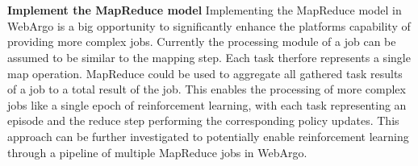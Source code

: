 \\~\\
\textbf{Implement the MapReduce model}
Implementing the MapReduce \cite{conclusion:map-reduce} model in WebArgo is a big opportunity to significantly enhance the platforms capability of providing more complex jobs. Currently the processing module of a job can be assumed to be similar to the mapping step. Each task therfore represents a single map operation. MapReduce could be used to aggregate all gathered task results of a job to a total result of the job. This enables the processing of more complex jobs like a single epoch of reinforcement learning, with each task representing an episode and the reduce step performing the corresponding policy updates. This approach can be further investigated to potentially enable reinforcement learning through a pipeline of multiple MapReduce jobs in WebArgo.